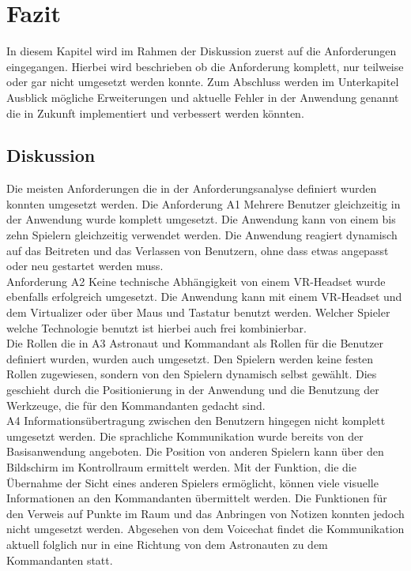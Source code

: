 \section{Fazit}
In diesem Kapitel wird im Rahmen der Diskussion zuerst auf die Anforderungen eingegangen. Hierbei wird beschrieben ob die Anforderung komplett, nur teilweise oder gar nicht umgesetzt werden konnte. Zum Abschluss werden im Unterkapitel Ausblick mögliche Erweiterungen und aktuelle Fehler in der Anwendung genannt die in Zukunft implementiert und verbessert werden könnten.

\subsection{Diskussion} \label{Diskussion}

Die meisten Anforderungen die in der Anforderungsanalyse definiert wurden konnten umgesetzt werden. Die Anforderung A1 \glqq Mehrere Benutzer gleichzeitig in der Anwendung\grqq{} wurde komplett umgesetzt. Die Anwendung kann von einem bis zehn Spielern gleichzeitig verwendet werden. Die Anwendung reagiert dynamisch auf das Beitreten und das Verlassen von Benutzern, ohne dass etwas angepasst oder neu gestartet werden muss.\\
Anforderung A2 \glqq Keine technische Abhängigkeit von einem VR-Headset\grqq{} wurde ebenfalls erfolgreich umgesetzt. Die Anwendung kann mit einem VR-Headset und dem Virtualizer oder über Maus und Tastatur benutzt werden. Welcher Spieler welche Technologie benutzt ist hierbei auch frei kombinierbar.\\
Die Rollen die in A3 \glqq Astronaut und Kommandant als Rollen für die Benutzer\grqq{} definiert wurden, wurden auch umgesetzt. Den Spielern werden keine festen Rollen zugewiesen, sondern von den Spielern dynamisch selbst gewählt. Dies geschieht durch die Positionierung in der Anwendung und die Benutzung der Werkzeuge, die für den Kommandanten gedacht sind.\\
A4 \glqq Informationsübertragung zwischen den Benutzern\grqq{} hingegen nicht komplett umgesetzt werden. Die sprachliche Kommunikation wurde bereits von der Basisanwendung angeboten. Die Position von anderen Spielern kann über den Bildschirm im Kontrollraum ermittelt werden. Mit der Funktion, die die Übernahme der Sicht eines anderen Spielers ermöglicht, können viele visuelle Informationen an den Kommandanten übermittelt werden. Die Funktionen für den Verweis auf Punkte im Raum und das Anbringen von Notizen konnten jedoch nicht umgesetzt werden. Abgesehen von dem Voicechat findet die Kommunikation aktuell folglich nur in eine Richtung von dem Astronauten zu dem Kommandanten statt.

